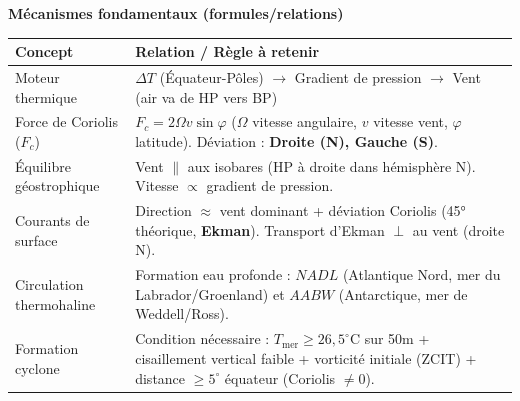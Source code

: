 \documentclass[11pt]{article}
\begin{document}
\begin{aretenir}
\textbf{Mécanismes fondamentaux (formules/relations)}
\begin{center}
\begin{tabularx}{\linewidth}{|l|X|}\hline
\textbf{Concept} & \textbf{Relation / Règle à retenir} \\\hline
Moteur thermique & $\Delta T$ (Équateur-Pôles) $\rightarrow$ Gradient de pression $\rightarrow$ Vent (air va de HP vers BP) \\\hline
Force de Coriolis ($F_c$) & $F_c = 2 \Omega v \sin\varphi$ \quad ($\Omega$ vitesse angulaire, $v$ vitesse vent, $\varphi$ latitude). Déviation : \textbf{Droite (N), Gauche (S)}. \\\hline
Équilibre géostrophique & Vent $\parallel$ aux isobares (HP à droite dans hémisphère N). Vitesse $\propto$ gradient de pression. \\\hline
Courants de surface & Direction $\approx$ vent dominant + déviation Coriolis (45° théorique, \textbf{Ekman}). Transport d'Ekman $\perp$ au vent (droite N). \\\hline
Circulation thermohaline & Formation eau profonde : \textbf{$NADL$} (Atlantique Nord, mer du Labrador/Groenland) et \textbf{$AABW$} (Antarctique, mer de Weddell/Ross). \\\hline
Formation cyclone & Condition nécessaire : $T_{\text{mer}} \ge 26,5^{\circ}\text{C}$ sur 50m + cisaillement vertical faible + vorticité initiale (ZCIT) + distance $\ge 5^{\circ}$ équateur (Coriolis $\ne 0$). \\\hline
\end{tabularx}
\end{center}


\end{aretenir}
\end{document}
